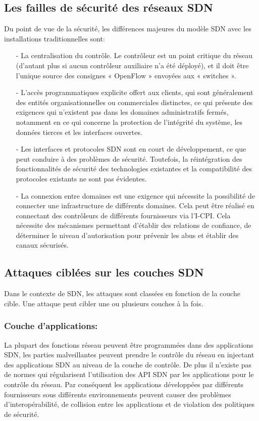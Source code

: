 \subsection{Les failles de sécurité des réseaux SDN}
Du point de vue de la sécurité, les différences majeures du modèle SDN avec les installations traditionnelles sont: \\
\begin{itemize}
\item[-]La centralisation du contrôle. Le contrôleur est un point critique du réseau (d’autant plus si aucun contrôleur auxiliaire n’a été déployé), et il doit être l’unique source des consignes « OpenFlow » envoyées aux « switches ».\\
\item[-]L’accès programmatiques explicite offert aux clients, qui sont généralement des entités organisationnelles  ou commerciales distinctes, ce qui présente des exigences qui n’existent pas dans les domaines administratifs fermés, notamment en ce qui concerne la protection de l’intégrité du système, les données tierces et les interfaces ouvertes.\\
\item[-]Les interfaces et protocoles SDN sont en court de développement, ce que peut conduire à des problèmes de sécurité. Toutefois, la réintégration des fonctionnalités de sécurité des technologies existantes et la compatibilité des protocoles existants ne sont pas évidentes.\\
\item[-]La connexion entre domaines est une exigence qui nécessite la possibilité de connecter une infrastructure de différents domaines. Cela peut être réalisé en connectant des contrôleurs de différents fournisseurs via l’I-CPI. Cela nécessite des mécanismes permettant d’établir des relations de confiance, de déterminer le niveau d’autorisation pour prévenir les abus et établir des canaux sécurisés.
\end{itemize}

\newpage
\subsection{Attaques ciblées sur les couches SDN}
\label{cibles}
Dans le contexte de SDN, les attaques sont classées en fonction de la couche cible. Une attaque peut cibler une ou plusieurs couches à la fois.
\subsubsection{Couche d'applications:} 
La plupart des fonctions réseau peuvent être programmées dans des applications SDN, les parties malveillantes peuvent prendre le contrôle du réseau en injectant des applications SDN au niveau de la couche de contrôle. De plus il n’existe pas de normes qui régularisent l’utilisation des API SDN par les applications pour le contrôle du réseau. Par conséquent les applications développées par différents fournisseurs sous différents environnements peuvent causer des problèmes d’interopérabilité, de collision entre les applications et de violation des politiques de sécurité.  

